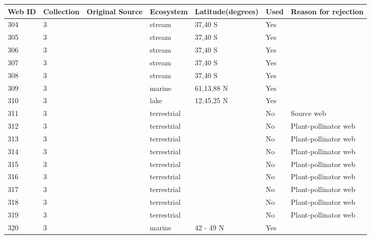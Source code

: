 \documentclass[12pt]{article}
\begin{document}
\begin{landscape}
    \begin{table}[h!]
    \centering
    {\footnotesize
      \begin{tabular}{p{2.8cm}p{1.3cm}p{5.5cm}p{2.2cm}p{2.5cm}lp{3.5cm}}
        \hline
        Web ID & Collection & Original Source & Ecosystem & Latitude(degrees) & Used  & Reason for rejection  \\
        \hline
        304   & 3 & \cite{Closs1994}  & stream & 37,40 S & Yes   &       \\
        305   & 3 & \cite{Closs1994}  & stream & 37,40 S & Yes   &       \\
        306   & 3 & \cite{Closs1994}  & stream & 37,40 S & Yes   &       \\
        307   & 3 & \cite{Closs1994}  & stream & 37,40 S & Yes   &       \\
        308   & 3 & \cite{Closs1994}  & stream & 37,40 S & Yes   &       \\
        309   & 3 & \cite{Gontikaki2011}  & marine & 61,13,88 N & Yes   &       \\
        310   & 3 & \cite{Khan2009}  & lake  & 12,45,25 N & Yes   &       \\
        311   & 3 & \cite{Memmott2000}     & terrestrial &       & No    & Source web \\
        312   & 3 & \cite{Kaiser-Bunbury2009}  & terrestrial &       & No    & Plant-pollinator web \\
        313   & 3 & \cite{Kaiser-Bunbury2009}  & terrestrial &       & No    & Plant-pollinator web \\
        314   & 3 & \cite{Kaiser-Bunbury2011}  & terrestrial &       & No    & Plant-pollinator web \\
        315   & 3 & \cite{Kaiser-Bunbury2011}  & terrestrial &       & No    & Plant-pollinator web \\
        316   & 3 & \cite{Kaiser-Bunbury2011}  & terrestrial &       & No    & Plant-pollinator web \\
        317   & 3 & \cite{Kaiser-Bunbury2011}  & terrestrial &       & No    & Plant-pollinator web \\
        318   & 3 & \cite{Kaiser-Bunbury2011}  & terrestrial &       & No    & Plant-pollinator web \\
        319   & 3 & \cite{Kaiser-Bunbury2011}  & terrestrial &       & No    & Plant-pollinator web \\
        320   & 3 & \cite{Ruzicka2012}    & marine & 42 - 49 N & Yes   &       \\

\end{tabular}}
\end{table}
\end{landscape}
\end{document}

